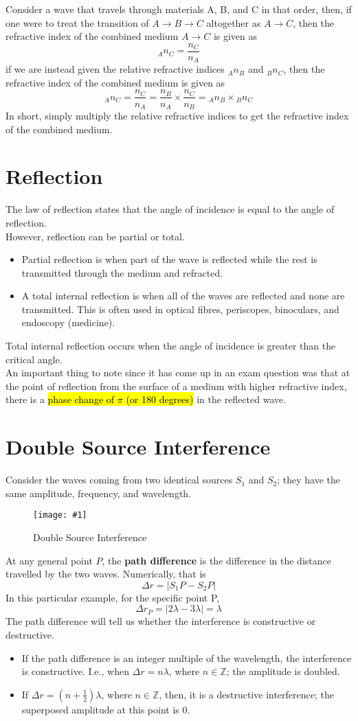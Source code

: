 \documentclass[a4paper,12pt]{article}
\let\oldsection\section
\renewcommand\section{\clearpage\oldsection}
\newcommand{\lb}{\\[8pt]}
\newcommand{\img}[4]{\begin{center}
  \begin{figure}[H]
    \centering
    \texttt{[image: \#1]}
    \caption{#3}
    \label{fig:#4}
  \end{figure}
\end{center}}
\begin{document}
Consider a wave that travels through materials A, B, and C in that order, then, if one were to treat the transition of $A\to B \to C$ altogether as $A\to C$, then the refractive index of the combined medium $A\to C$ is given as $$_An_C = \frac{n_C}{n_A}$$
if we are instead given the relative refractive indices $_An_B$ and $_Bn_C$, then the refractive index of the combined medium is given as $$_An_C = \frac{n_C}{n_A} = \frac{n_B}{n_A}\times \frac{n_C}{n_B}  = \phantom{}_An_B \times \phantom{}_Bn_C$$
In short, simply multiply the relative refractive indices to get the refractive index of the combined medium.

\section{Reflection}
The law of reflection states that the angle of incidence is equal to the angle of reflection.\lb
However, reflection can be partial or total.
\begin{itemize}
  \item Partial reflection is when part of the wave is reflected while the rest is transmitted through the medium and refracted.
  \item A total internal reflection is when all of the waves are reflected and none are transmitted. This is often used in optical fibres, periscopes, binoculars, and endoscopy (medicine).
\end{itemize}

Total internal reflection occurs when the angle of incidence is greater than the critical angle.\lb
An important thing to note since it has come up in an exam question was that at the point of reflection from the surface of a medium with higher refractive index, there is a \hl{phase change of $\pi$ (or 180 degrees)} in the reflected wave.

\section{Double Source Interference}

Consider the waves coming from two identical sources $S_1$ and $S_2$; they have the same amplitude, frequency, and wavelength.

\img{doublesource.png}{0.4}{Double Source Interference}{doublesource}

At any general point $P$, the \textbf{path difference} is the difference in the distance travelled by the two waves. Numerically, that is $$\Delta r = \lvert S_1P - S_2P \rvert$$
In this particular example, for the specific point P, $$\Delta r_P = |2\lambda - 3\lambda| = \lambda$$
The path difference will tell us whether the interference is constructive or destructive.
\begin{itemize}
  \item If the path difference is an integer multiple of the wavelength, the interference is constructive. I.e., when $\Delta r = n\lambda$, where $n \in \mathbb{Z}$; the amplitude is doubled.
  \item If $\Delta r = (n + \frac{1}{2})\lambda$, where $n \in \mathbb{Z}$, then, it is a destructive interference; the superposed amplitude at this point is 0.
\end{itemize}
\end{document}

